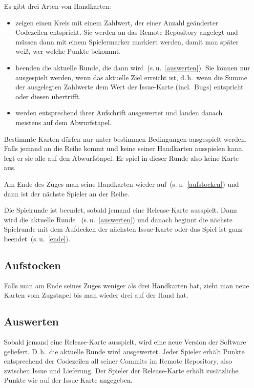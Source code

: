 \documentclass[DIV=15, fontsize=11pt]{gitgame}
\begin{document}
Es gibt drei Arten von Handkarten:
\begin{itemize}
	\item {} zeigen einen Kreis mit einem Zahlwert, der einer Anzahl geänderter Codezeilen entspricht. Sie werden an das Remote Repository angelegt und müssen dann mit einem Spielermarker markiert werden, damit man später weiß, wer welche Punkte bekommt.
	\item {} beenden die aktuelle Runde, die dann  wird~(s.\,u.~\ref{auswerten}). Sie können nur ausgespielt werden, wenn das aktuelle Ziel erreicht ist, d.\,h.\ wenn die Summe der ausgelegten Zahlwerte dem Wert der Issue-Karte (incl.\ Bugs) entspricht oder diesen übertrifft.
	\item {} werden entsprechend ihrer Aufschrift ausgewertet und landen danach meistens auf dem Abwurfstapel.
\end{itemize}

Bestimmte Karten dürfen nur unter bestimmen Bedingungen ausgespielt werden. Falls jemand an die Reihe kommt und keine seiner Handkarten ausspielen kann, legt er sie alle auf den Abwurfstapel. Er spiel in dieser Runde also keine Karte aus.

Am Ende des Zuges  man seine Handkarten wieder auf~(s.\,u.~\ref{aufstocken}) und dann ist der nächste Spieler an der Reihe.

Die Spielrunde ist beendet, sobald jemand eine Release-Karte ausspielt. Dann wird die aktuelle Runde ~(s.\,u.~\ref{auswerten}) und danach beginnt die nächste Spielrunde mit dem Aufdecken der nächsten Issue-Karte oder das Spiel ist ganz beendet~(s.\,u.~\ref{ende}).


\subsection{Aufstocken\label{aufstocken}}
Falls man am Ende seines Zuges weniger als drei Handkarten hat, zieht man neue Karten vom Zugstapel bis man wieder drei auf der Hand hat.


\subsection{Auswerten\label{auswerten}}
Sobald jemand eine Release-Karte ausspielt, wird eine neue Version der Software geliefert. D.\,h.\ die aktuelle Runde wird ausgewertet. Jeder Spieler erhält Punkte entsprechend der Codezeilen all seiner Commits im Remote Repository, also zwischen Issue und Lieferung. Der Spieler der Release-Karte erhält zusätzliche Punkte wie auf der Issue-Karte angegeben.
\end{document}
